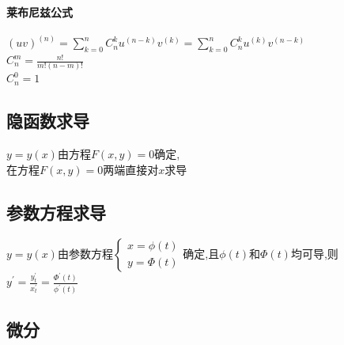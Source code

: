 \documentclass{article}
\begin{document}
\begin{flushleft}
	\paragraph{莱布尼兹公式}
	$(uv)^{(n)} = \sum\limits_{k=0}^{n} C_n^k u^{(n-k)} v^{(k)} = \sum\limits_{k=0}^{n} C_n^k u^{(k)} v^{(n-k)}$\\
	$C_n^m=\frac{n!}{m!(n-m)!}$\\
	$C_n^0=1$\\
	
	\subsection{隐函数求导}
	
	$y=y(x)$由方程$F(x,y)=0$确定,\\
	在方程$F(x,y)=0$两端直接对$x$求导\\
	
	\subsection{参数方程求导}
	
	$y=y(x)$由参数方程$\left\{
	\begin{array}{rcl}
	x=\phi(t)\\
	y=\Phi(t)
	\end{array} \right.$确定,且$\phi(t)$和$\Phi(t)$均可导,则$y^{'}=\frac{y^{'}_t}{x^{'}_t}=\frac{\Phi^{'}(t)}{\phi^{'}(t)}$\\
	
	\subsection{微分}
	

\end{flushleft}
\end{document}
